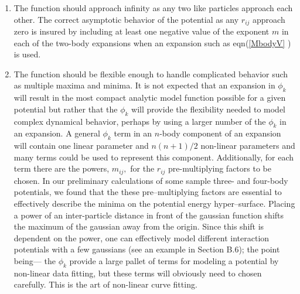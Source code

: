 \begin{enumerate}
\item  
The function should approach infinity as any two like particles
approach each other.
The correct asymptotic behavior of the potential as any $r_{ij}$ approach
zero is insured by including at least one negative value of the exponent $m$
in each of the two-body expansions when an expansion such as eqn(\ref{MbodyV}%
) is used. 


\item  
The function should be flexible enough to handle complicated behavior
such as multiple maxima and minima.
It is not expected that an expansion in $\phi _k$ will result in the most
compact analytic model function possible for a given potential but rather
that the $\phi _k$ will provide the flexibility needed to model complex
dynamical behavior, perhaps by using a larger 
number of the $\phi _k$ in an
expansion. A general $\phi _k$ term in an $n$-body component of an expansion
will contain one linear parameter and $n\left( n+1\right) /2$ non-linear
parameters and many terms could be used to represent this component.
Additionally, 
for each term there are the powers, $m_{ij},$ for the $r_{ij}$
pre-multiplying factors to be chosen. 
In our preliminary calculations of some sample three- and four-body
potentials, we found that the these pre--multiplying factors 
are essential to effectively describe the minima on the
potential energy hyper--surface.
Placing a power of an inter-particle distance in front of the gaussian
function
shifts the maximum of the gaussian away from the origin.
Since this shift is dependent on the power, one can effectively 
model different interaction potentials with a few gaussians
(see an example in Section B.6);
the point being---
the $\phi _k$ provide a large pallet of terms for modeling a potential by
non-linear data fitting, but these terms will obviously need to chosen
carefully. This is the art of non-linear curve fitting. 





\end{enumerate}
